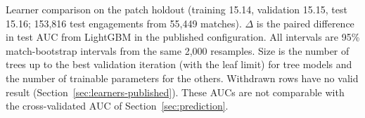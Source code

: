 \begin{table}[t]
\centering
\caption{Learner comparison on the patch holdout (training 15.14, validation 15.15, test 15.16; 153,816
test engagements from 55,449 matches). $\Delta$ is the paired difference in test AUC from LightGBM in the
published configuration. All intervals are 95\% match-bootstrap intervals from the same 2,000 resamples.
Size is the number of trees up to the best validation iteration (with the leaf limit) for tree models and
the number of trainable parameters for the others. Withdrawn rows have no valid result
(Section~\ref{sec:learners-published}). These AUCs are not comparable with the cross-validated AUC of
Section~\ref{sec:prediction}.}
\label{tab:learners}

\end{table}
